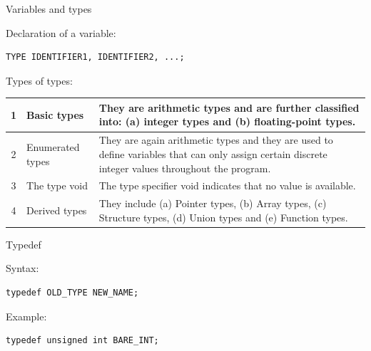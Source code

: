 \documentclass[10pt]{beamer}
\begin{document}
\begin{frame}[fragile]{Variables and types}

Declaration of a variable:

\begin{lstlisting}
TYPE IDENTIFIER1, IDENTIFIER2, ...;
\end{lstlisting}

Types of types:

\begin{center}
  \renewcommand{\arraystretch}{1.7}
  \vspace{-1.8em}%
  \begin{tabular}{ | c | m{2cm} | m{8cm} | }
    \hline
    1 & Basic types & They are arithmetic types and are further classified into: (a) integer types and (b) floating-point types. \\ \hline
    2 & Enumerated types & They are again arithmetic types and they are used to define variables that can only assign certain discrete integer values throughout the program. \\ \hline
    3 & The type void & The type specifier void indicates that no value is available. \\ \hline
    4 & Derived types & They include (a) Pointer types, (b) Array types, (c) Structure types, (d) Union types and (e) Function types. \\
    \hline
  \end{tabular}
\end{center}

\end{frame}


\begin{frame}[fragile]{Typedef}

Syntax:

\begin{lstlisting}
typedef OLD_TYPE NEW_NAME;
\end{lstlisting}

Example:

\begin{lstlisting}
typedef unsigned int BARE_INT;
\end{lstlisting}
\end{frame}
\end{document}
